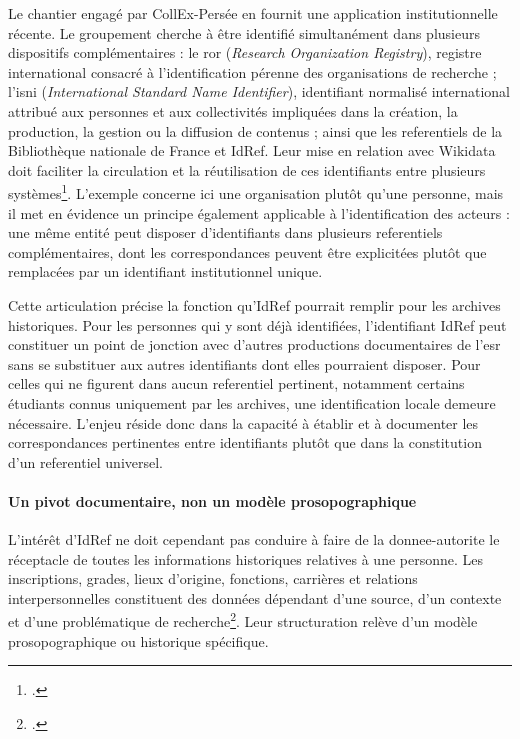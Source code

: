 Le chantier engagé par CollEx-Persée en fournit une application institutionnelle récente. Le groupement cherche à être identifié simultanément dans plusieurs dispositifs complémentaires : le \gls{ror} (\emph{Research Organization Registry}), registre international consacré à l'identification pérenne des organisations de recherche ; l'\gls{isni} (\emph{International Standard Name Identifier}), identifiant normalisé international attribué aux personnes et aux collectivités impliquées dans la création, la production, la gestion ou la diffusion de contenus ; ainsi que les \glspl{referentiel} de la Bibliothèque nationale de France et IdRef. Leur mise en relation avec Wikidata doit faciliter la circulation et la réutilisation de ces identifiants entre plusieurs systèmes\footcite{CollExPerseeIdentifiants2026}. L'exemple concerne ici une organisation plutôt qu'une personne, mais il met en évidence un principe également applicable à l'identification des acteurs : une même entité peut disposer d'identifiants dans plusieurs \glspl{referentiel} complémentaires, dont les correspondances peuvent être explicitées plutôt que remplacées par un identifiant institutionnel unique.

Cette articulation précise la fonction qu'IdRef pourrait remplir pour les archives historiques. Pour les personnes qui y sont déjà identifiées, l'identifiant IdRef peut constituer un point de jonction avec d'autres productions documentaires de l'\gls{esr} sans se substituer aux autres identifiants dont elles pourraient disposer. Pour celles qui ne figurent dans aucun \gls{referentiel} pertinent, notamment certains étudiants connus uniquement par les archives, une identification locale demeure nécessaire. L'enjeu réside donc dans la capacité à établir et à documenter les correspondances pertinentes entre identifiants plutôt que dans la constitution d'un \gls{referentiel} universel.


\paragraph{Un pivot documentaire, non un modèle prosopographique}

L'intérêt d'IdRef ne doit cependant pas conduire à faire de la \gls{donnee-autorite} le réceptacle de toutes les informations historiques relatives à une personne. Les inscriptions, grades, lieux d'origine, fonctions, carrières et relations interpersonnelles constituent des données dépendant d'une source, d'un contexte et d'une problématique de recherche\footcite{BissonGoloubkoff2020}. Leur structuration relève d'un modèle prosopographique ou historique spécifique.

